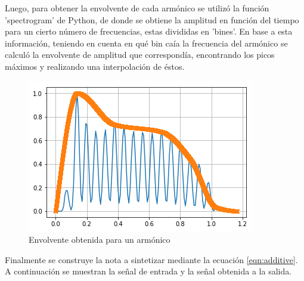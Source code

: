 \documentclass[assd_tp2_main.tex]{subfiles}
\begin{document}
Luego, para obtener la envolvente de cada armónico se utilizó la función 'spectrogram' de Python, de donde se obtiene la amplitud en función del tiempo para un cierto número de frecuencias, estas divididas en 'bines'. 
En base a esta información, teniendo en cuenta en qué bin caía la frecuencia del armónico se calculó la envolvente de amplitud que correspondía, encontrando los picos máximos y realizando una interpolación de éstos.

\begin{figure}[H]
	\centering
	\includegraphics[scale=0.75]{graficos/envelope.png}
	\caption{Envolvente obtenida para un armónico}
\end{figure} 

Finalmente se construye la nota a sintetizar mediante la ecuación \ref{eqn:additive}. A continuación se muestran la señal de entrada y la señal obtenida a la salida.
\end{document}
